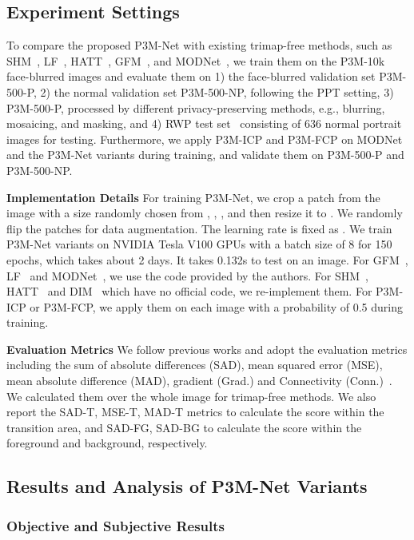 \documentclass[twocolumn]{svjour3}
\begin{document}
\subsection{Experiment Settings}
To compare the proposed P3M-Net with existing trimap-free methods, such as SHM~\citep{shm}, LF~\citep{lf}, HATT~\citep{hatt}, GFM~\citep{gfm}, and MODNet~\citep{modnet}, we train them on the P3M-10k face-blurred images and evaluate them on 1) the face-blurred validation set P3M-500-P, 2) the normal validation set P3M-500-NP, following the PPT setting, 3) P3M-500-P, processed by different privacy-preserving methods, e.g., blurring, mosaicing, and masking, and 4) RWP test set~\citep{yu2021mask} consisting of 636 normal portrait images for testing. Furthermore, we apply P3M-ICP and P3M-FCP on MODNet~\citep{modnet} and the P3M-Net variants during training, and validate them on P3M-500-P and P3M-500-NP. 


\noindent\textbf{Implementation Details}
For training P3M-Net, we crop a patch from the image with a size randomly chosen from , , , and then resize it to . We randomly flip the patches for data augmentation. The learning rate is fixed as . We train P3M-Net variants on NVIDIA Tesla V100 GPUs with a batch size of 8 for 150 epochs, which takes about 2 days. It takes 0.132s to test on an  image. For GFM~\citep{gfm}, LF~\citep{lf} and MODNet~\citep{modnet}, we use the code provided by the authors. For SHM~\citep{shm}, HATT~\citep{hatt} and DIM~\citep{dim} which have no official code, we re-implement them. For P3M-ICP or P3M-FCP, we apply them on each image with a probability of 0.5 during training.

\noindent\textbf{Evaluation Metrics} We follow previous works and adopt the evaluation metrics including the sum of absolute differences (SAD), mean squared error (MSE), mean absolute difference (MAD), gradient (Grad.) and Connectivity (Conn.)~\citep{rhemann2009perceptually}. We calculated them over the whole image for trimap-free methods. We also report the SAD-T, MSE-T, MAD-T metrics to calculate the score within the transition area, and SAD-FG, SAD-BG to calculate the score within the foreground and background, respectively.




\subsection{Results and Analysis of P3M-Net Variants}
\subsubsection{Objective and Subjective Results}
\label{sec:exp}
\end{document}
